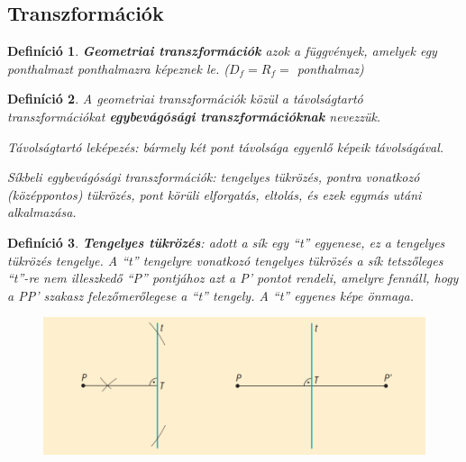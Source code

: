 \documentclass[12pt,a4paper]{article}
\newtheorem{definition}{Definíció} [section]
\begin{document}
\subsection{Transzformációk}

\begin{definition}
\textbf{Geometriai transzformációk} azok a függvények, amelyek egy ponthalmazt ponthalmazra képeznek le. ($D_f=R_f=$ ponthalmaz)
\end{definition}

\begin{definition}
A geometriai transzformációk közül a távolságtartó transzformációkat \textbf{egybevágósági transzformációknak} nevezzük.

Távolságtartó leképezés: bármely két pont távolsága egyenlő képeik távolságával.

Síkbeli egybevágósági transzformációk: tengelyes tükrözés, pontra vonatkozó (középpontos) tükrözés, pont körüli elforgatás, eltolás, és ezek egymás utáni alkalmazása.
\end{definition}

\begin{definition}
\textbf{Tengelyes tükrözés}: adott a sík egy ``t'' egyenese, ez a tengelyes tükrözés tengelye. A ``t'' tengelyre vonatkozó tengelyes tükrözés a sík tetszőleges ``t''-re nem illeszkedő ``P'' pontjához azt a P' pontot rendeli, amelyre fennáll, hogy a PP' szakasz felezőmerőlegese a ``t'' tengely. A ``t'' egyenes képe önmaga.
\begin{figure}[h!]
\centering
\includegraphics[scale=0.3]{geometry/tengelyes_tukr}
\end{figure}
\end{definition}
\end{document}
